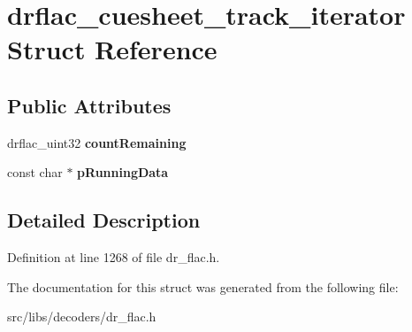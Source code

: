 \hypertarget{structdrflac__cuesheet__track__iterator}{\section{drflac\-\_\-cuesheet\-\_\-track\-\_\-iterator Struct Reference}
\label{structdrflac__cuesheet__track__iterator}
}
\subsection*{Public Attributes}
\begin{DoxyCompactItemize}
\item 
\hypertarget{structdrflac__cuesheet__track__iterator_ae2bdeb50d14b37c469cab1722255b31c}{drflac\-\_\-uint32 {\bfseries count\-Remaining}}\label{structdrflac__cuesheet__track__iterator_ae2bdeb50d14b37c469cab1722255b31c}

\item 
\hypertarget{structdrflac__cuesheet__track__iterator_af31dbd17feeb7f8a2d11f3440f95b368}{const char $\ast$ {\bfseries p\-Running\-Data}}\label{structdrflac__cuesheet__track__iterator_af31dbd17feeb7f8a2d11f3440f95b368}

\end{DoxyCompactItemize}


\subsection{Detailed Description}


Definition at line 1268 of file dr\-\_\-flac.\-h.



The documentation for this struct was generated from the following file\-:\begin{DoxyCompactItemize}
\item 
src/libs/decoders/dr\-\_\-flac.\-h\end{DoxyCompactItemize}
